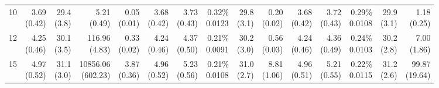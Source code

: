 \documentclass[11pt]{article}
\theoremstyle{plain}
\theoremstyle{definition}
\begin{document}
\begin{landscape}
\begin{table}
{\begin{tabular}{r|rrrr|rrrrr|rrrrr}
 				10 & \makecell{3.69\\ (0.42)} & \makecell{29.4\\ (3.8)} & \makecell{5.21\\ (0.49)} & \makecell{0.05\\ (0.01)} & \makecell{3.68\\ (0.42)} & \makecell{3.73\\ (0.43)} & \makecell{0.32\% \\ 0.0123} & \makecell{29.8\\ (3.1)} & \makecell{0.20\\ (0.02)} & \makecell{3.68\\ (0.42)} & \makecell{3.72\\ (0.43)} & \makecell{0.29\% \\ 0.0108} & \makecell{29.9\\ (3.1)} & \makecell{1.18\\ (0.25)} \\
 				12 & \makecell{4.25\\ (0.46)} & \makecell{30.1\\ (3.5)} & \makecell{116.96\\ (4.83)} & \makecell{0.33\\ (0.02)} & \makecell{4.24\\ (0.46)} & \makecell{4.37\\ (0.50)} & \makecell{0.21\% \\ 0.0091} & \makecell{30.2\\ (3.0)} & \makecell{0.56\\ (0.03)} & \makecell{4.24\\ (0.46)} & \makecell{4.36\\ (0.49)} & \makecell{0.24\% \\ 0.0103} & \makecell{30.2\\ (2.8)} & \makecell{7.00\\ (1.86)} \\
 				15 & \makecell{4.97\\ (0.52)} & \makecell{31.1\\ (3.0)} & \makecell{10856.06\\ (602.23)} & \makecell{3.87\\ (0.36)} & \makecell{4.96\\ (0.52)} & \makecell{5.23\\ (0.56)} & \makecell{0.21\% \\ 0.0108} & \makecell{31.0\\ (2.7)} & \makecell{8.81\\ (1.06)} & \makecell{4.96\\ (0.51)} & \makecell{5.21\\ (0.55)} & \makecell{0.22\% \\ 0.0115} & \makecell{31.2\\ (2.6)} & \makecell{99.87\\ (19.64)} \\

\end{tabular}}
\end{table}
\end{landscape}
\end{document}
